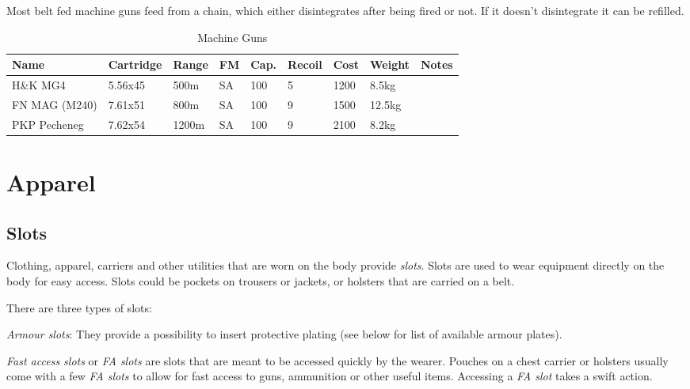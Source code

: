 Most belt fed machine guns feed from a chain, which either disintegrates after
being fired or not. If it doesn't disintegrate it can be refilled.

\begin{table}
  \caption{Machine Guns}
  \label{tab:LMG}
  \begin{center}
    \begin{tabular}{| l | l | l | l | l | l | l | l | l |}
      \hline
      \textbf{Name} & \textbf{Cartridge} & \textbf{Range} &
      \textbf{FM} & \textbf{Cap.} & \textbf{Recoil} &
      \textbf{Cost} & \textbf{Weight} & \textbf{Notes} \\ \hline


      H\&K MG4      & 5.56x45 &  500m & SA & 100 & 5 & 1200 &  8.5kg & \\ \hline
      FN MAG (M240) & 7.61x51 &  800m & SA & 100 & 9 & 1500 & 12.5kg & \\ \hline
      PKP Pecheneg  & 7.62x54 & 1200m & SA & 100 & 9 & 2100 &  8.2kg & \\ \hline

    \end{tabular}
  \end{center}
\end{table}

\section{Apparel}
\label{sec:10-Apparel}

\subsection{Slots}
\label{sec:10-Slots}

Clothing, apparel, carriers and other utilities that are worn on the body
provide \emph{slots}. Slots are used to wear equipment directly on the body
for easy access. Slots could be pockets on trousers or jackets, or holsters that
are carried on a belt.

There are three types of slots:

\emph{Armour slots}: They provide a possibility to insert protective plating
(see below for list of available armour plates).

\emph{Fast access slots} or \emph{FA slots} are slots that are meant to be
accessed quickly by the wearer. Pouches on a chest carrier or holsters usually
come with a few \emph{FA slots} to allow for fast access to guns, ammunition
or other useful items. Accessing a \emph{FA slot} takes a swift action.

